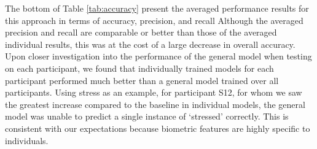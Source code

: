 The bottom  of Table \ref{tab:accuracy} present the averaged performance results for this approach in terms of accuracy, precision, and recall Although the averaged precision and recall are comparable or better than those of the averaged individual results, this was at the cost of a large decrease in overall accuracy.  Upon closer investigation into the performance of the general model when testing on each participant, we found that individually trained models for each participant performed much better than a general model trained over all participants. Using stress as an example, for participant S12, for whom we saw the greatest increase compared to the baseline in individual models, the general model was unable to predict a single instance of `stressed' correctly. This is consistent with our expectations because biometric features are highly specific to individuals.




